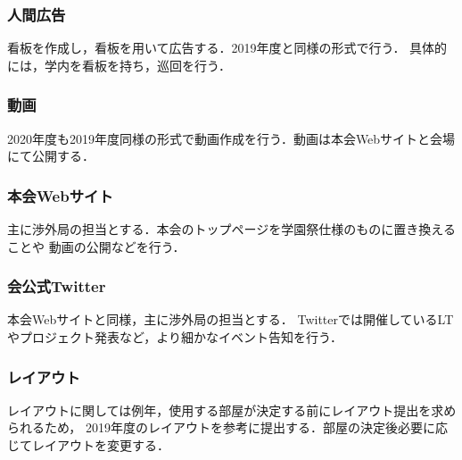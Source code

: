 \subsubsection*{人間広告}
看板を作成し，看板を用いて広告する．2019年度と同様の形式で行う．
具体的には，学内を看板を持ち，巡回を行う．

\subsubsection*{動画}
2020年度も2019年度同様の形式で動画作成を行う．動画は本会Webサイトと会場にて公開する．


\subsubsection*{本会Webサイト}
主に渉外局の担当とする．本会のトップページを学園祭仕様のものに置き換えることや
動画の公開などを行う．

\subsubsection*{会公式Twitter}
本会Webサイトと同様，主に渉外局の担当とする．
Twitterでは開催しているLTやプロジェクト発表など，より細かなイベント告知を行う．

\subsubsection*{レイアウト}
レイアウトに関しては例年，使用する部屋が決定する前にレイアウト提出を求められるため，
2019年度のレイアウトを参考に提出する．部屋の決定後必要に応じてレイアウトを変更する．

